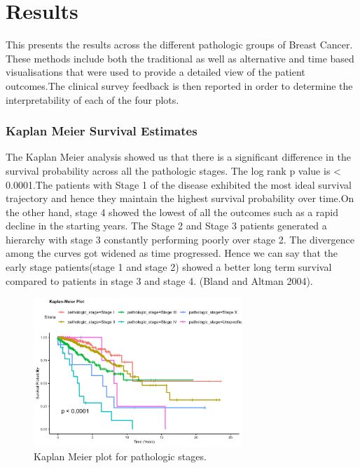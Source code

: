 \documentclass{article}
\begin{document}
\section{Results}\label{results}

This presents the results across the different pathologic groups of Breast Cancer. These methods include both the traditional as well as alternative and time based visualisations that were used to provide a detailed view of the patient outcomes.The clinical survey feedback is then reported in order to determine the interpretability of each of the four plots.

\subsubsection{Kaplan Meier Survival Estimates}\label{kaplan-meier-survival-estimates}

The Kaplan Meier analysis showed us that there is a significant difference in the survival probability across all the pathologic stages. The log rank p value is \textless{} 0.0001.The patients with Stage 1 of the disease exhibited the most ideal survival trajectory and hence they maintain the highest survival probability over time.On the other hand, stage 4 showed the lowest of all the outcomes such as a rapid decline in the starting years. The Stage 2 and Stage 3 patients generated a hierarchy with stage 3 constantly performing poorly over stage 2. The divergence among the curves got widened as time progressed. Hence we can say that the early stage patients(stage 1 and stage 2) showed a better long term survival compared to patients in stage 3 and stage 4. (Bland and Altman 2004).

\begin{figure}[H]
  \centering
  \includegraphics[width=0.7\textwidth]{km_curve.png}
  \caption{Kaplan Meier plot for pathologic stages.}
  \label{fig:km_curve}
\end{figure}
\end{document}
